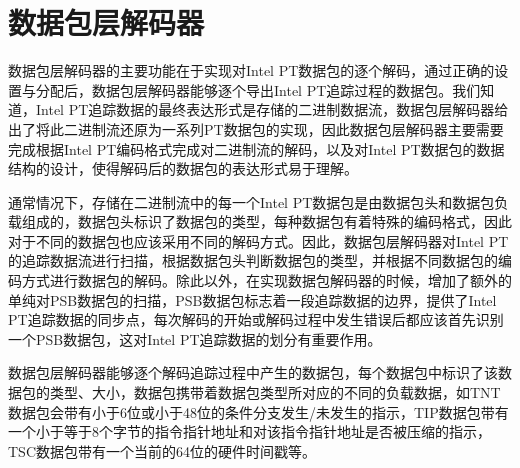 \section{数据包层解码器}
数据包层解码器的主要功能在于实现对Intel PT数据包的逐个解码，通过正确的设置与分配后，数据包层解码器能够逐个导出Intel PT追踪过程的数据包。我们知道，Intel PT追踪数据的最终表达形式是存储的二进制数据流，数据包层解码器给出了将此二进制流还原为一系列PT数据包的实现，因此数据包层解码器主要需要完成根据Intel PT编码格式完成对二进制流的解码，以及对Intel PT数据包的数据结构的设计，使得解码后的数据包的表达形式易于理解。

通常情况下，存储在二进制流中的每一个Intel PT数据包是由数据包头和数据包负载组成的，数据包头标识了数据包的类型，每种数据包有着特殊的编码格式，因此对于不同的数据包也应该采用不同的解码方式。因此，数据包层解码器对Intel PT的追踪数据流进行扫描，根据数据包头判断数据包的类型，并根据不同数据包的编码方式进行数据包的解码。除此以外，在实现数据包解码器的时候，增加了额外的单纯对PSB数据包的扫描，PSB数据包标志着一段追踪数据的边界，提供了Intel PT追踪数据的同步点，每次解码的开始或解码过程中发生错误后都应该首先识别一个PSB数据包，这对Intel PT追踪数据的划分有重要作用。

数据包层解码器能够逐个解码追踪过程中产生的数据包，每个数据包中标识了该数据包的类型、大小，数据包携带着数据包类型所对应的不同的负载数据，如TNT数据包会带有小于6位或小于48位的条件分支发生/未发生的指示，TIP数据包带有一个小于等于8个字节的指令指针地址和对该指令指针地址是否被压缩的指示，TSC数据包带有一个当前的64位的硬件时间戳等。

